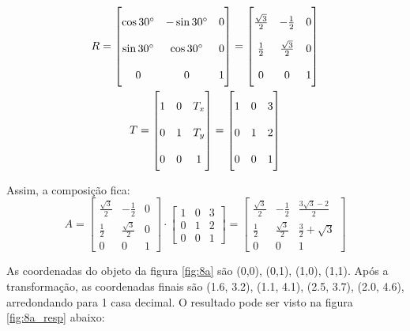 \documentclass[12pt]{article}
\begin{document}
\begin{gather*}
    \renewcommand\arraystretch{2}
    R=
    \begin{bmatrix}
    \cos{30\degree} & -\sin{30\degree} & 0 \\
    \sin{30\degree} & \cos{30\degree} & 0 \\
    0 & 0 & 1
    \end{bmatrix} 
    =
    \begin{bmatrix}
    \frac{\sqrt{3}}{2} & -\frac{1}{2} & 0 \\
    \frac{1}{2} & \frac{\sqrt{3}}{2} & 0 \\
    0 & 0 & 1
    \end{bmatrix}\\
    T = 
    \begin{bmatrix}
    1 & 0 & T_x \\
    0 & 1 & T_y \\
    0 & 0 & 1
    \end{bmatrix}
    =
    \begin{bmatrix}
    1 & 0 & 3 \\
    0 & 1 & 2 \\
    0 & 0 & 1
    \end{bmatrix}    
\end{gather*}

Assim, a composição fica:
\begin{equation*}
    \renewcommand\arraystretch{2}
    A = 
    \begin{bmatrix}
    \frac{\sqrt{3}}{2} & -\frac{1}{2} & 0 \\
    \frac{1}{2} & \frac{\sqrt{3}}{2} & 0 \\
    0 & 0 & 1
    \end{bmatrix}
    \cdot
    \begin{bmatrix}
    1 & 0 & 3 \\
    0 & 1 & 2 \\
    0 & 0 & 1
    \end{bmatrix}
    =
    \begin{bmatrix}
    \frac{\sqrt{3}}{2} & -\frac{1}{2} & \frac{3\sqrt{3}-2}{2} \\
    \frac{1}{2} & \frac{\sqrt{3}}{2} & \frac{3}{2} + \sqrt{3} \\
    0 & 0 & 1
    \end{bmatrix}
\end{equation*}

As coordenadas do objeto da figura \ref{fig:8a} são (0,0), (0,1), (1,0), (1,1). Após a transformação, as coordenadas finais são (1.6, 3.2), (1.1, 4.1), (2.5, 3.7), (2.0, 4.6), arredondando para 1 casa decimal. O resultado pode ser visto na figura \ref{fig:8a_resp} abaixo:
\end{document}
